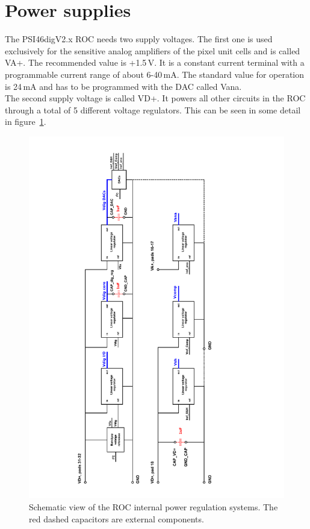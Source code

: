 
\section{Power supplies}
The PSI46digV2.x ROC needs two supply voltages. The first one is used exclusively for the sensitive analog amplifiers of the pixel unit cells and is called VA+. The recommended value is +1.5\,V. It is a constant current terminal with a programmable current range of about 6-40\,mA. The standard value for operation is 24\,mA and has to be programmed with the DAC called Vana.\\
The second supply voltage is called VD+. It powers all other circuits in the ROC through a total of 5 different voltage regulators. This can be seen in some detail in figure~\ref{fig:ROCpowering}.\\  



\begin{figure}[hbtp]
	\begin{center}
	\includegraphics[width=\textwidth]{img/Powering.pdf}
	\end{center}
	\caption{Schematic view of the ROC internal power regulation systems. The red dashed capacitors are external components.}
	\label{fig:ROCpowering}
\end{figure}

